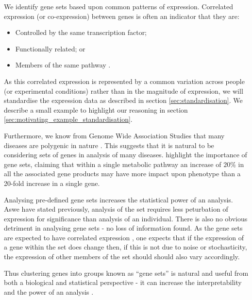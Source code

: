 \documentclass[12pt]{article} %
\begin{document}
	We identify gene sets based upon common patterns of expression. Correlated expression (or co-expression) between genes is often an indicator that they are:
	\begin{itemize}
		\item Controlled by the same transcription factor;
		\item Functionally related; or
		\item Members of the same pathway \cite{WeirauchGeneCoexpressionNetworks2011}.
	\end{itemize}
	As this correlated expression is represented by a common variation across people (or experimental conditions) rather than in the magnitude of expression, we will standardise the expression data as described in section \ref{sec:standardisation}. We describe a small example to highlight our reasoning in section \ref{sec:motivating_example_standardisation}.
	
	Furthermore, we know from Genome Wide Association Studies that many diseases are polygenic in nature \cite{MooneyGenesetanalysis2015}. This suggests that it is natural to be considering sets of genes in analysis of many diseases. \citet{SubramanianGenesetenrichment2005a} highlight the importance of gene sets, claiming that within a single metabolic pathway an increase of $20\%$ in all the associated gene products may have more impact upon phenotype than a 20-fold increase in a single gene.
	
	Analysing pre-defined gene sets increases the statistical power of an analysis\cite{MooneyGenesetanalysis2015}. Aswe have stated previously, analysis of the set requires less peturbation of expression for significance than analysis of an individual. There is also no obvious detriment in analysing gene sets - no loss of information found. As the gene sets are expected to have correlated expression \cite{WeirauchGeneCoexpressionNetworks2011}, one expects that if the expression of a gene within the set does change then, if this is not due to noise or stochasticity, the expression of other members of the set should should also vary accordingly.
	
	Thus clustering genes into groups known as ``gene sets'' is natural and useful from both a biological and statistical perspective - it can increase the interpretability and the power of an analysis \cite{NicaExpressionquantitativetrait2013}\cite{VosaUnravelingpolygenicarchitecture2018}.
	
\end{document}
